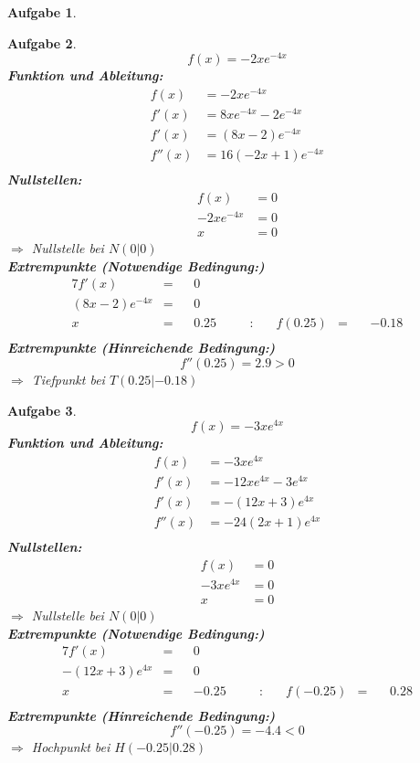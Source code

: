 \documentclass[12pt]{article}
\theoremstyle{note}
\newtheorem{aufgabe}{Aufgabe}
\begin{document}
\begin{flushleft}
\begin{aufgabe}
\end{aufgabe}\clearpage\begin{aufgabe} ~  
$$f(x)=- 2 x e^{- 4 x}$$ 
{\bf Funktion und Ableitung:} 
\begin{align*} 
f(x)&=- 2 x e^{- 4 x}\\ 
f'(x)&=8 x e^{- 4 x} - 2 e^{- 4 x}\\ 
f'(x)&=\left(8 x - 2\right) e^{- 4 x}\\ 
f''(x)&=16 \left(- 2 x + 1\right) e^{- 4 x}\\ 
\end{align*} 
{\bf Nullstellen:} 
\begin{align*} 
f(x)&=0 \\ 
- 2 x e^{- 4 x}&=0 \\ 
x&=0\end{align*} 
$\Rightarrow$ Nullstelle bei $N(0|0)$ \\ 
{\bf Extrempunkte (Notwendige Bedingung:)} 
\begin{alignat*}{7} 
f'(x)&=& &0& \\ 
\left(8 x - 2\right) e^{- 4 x}&=& &0& \\ 
x&=& &0.25& \quad &:& \quad f(0.25)&=& \, &-0.18\\ 
\end{alignat*} 
{\bf Extrempunkte (Hinreichende Bedingung:)} 
\\ 
$$f''(0.25)=2.9> 0 $$ 
$\Rightarrow$ Tiefpunkt bei $T(0.25|-0.18)$ \\ 

\end{aufgabe}\clearpage\begin{aufgabe} ~  
$$f(x)=- 3 x e^{4 x}$$ 
{\bf Funktion und Ableitung:} 
\begin{align*} 
f(x)&=- 3 x e^{4 x}\\ 
f'(x)&=- 12 x e^{4 x} - 3 e^{4 x}\\ 
f'(x)&=- \left(12 x + 3\right) e^{4 x}\\ 
f''(x)&=- 24 \left(2 x + 1\right) e^{4 x}\\ 
\end{align*} 
{\bf Nullstellen:} 
\begin{align*} 
f(x)&=0 \\ 
- 3 x e^{4 x}&=0 \\ 
x&=0\end{align*} 
$\Rightarrow$ Nullstelle bei $N(0|0)$ \\ 
{\bf Extrempunkte (Notwendige Bedingung:)} 
\begin{alignat*}{7} 
f'(x)&=& &0& \\ 
- \left(12 x + 3\right) e^{4 x}&=& &0& \\ 
x&=& &-0.25& \quad &:& \quad f(-0.25)&=& \, &0.28\\ 
\end{alignat*} 
{\bf Extrempunkte (Hinreichende Bedingung:)} 
\\ 
$$f''(-0.25)=-4.4< 0 $$ 
$\Rightarrow$ Hochpunkt bei $H(-0.25|0.28)$ \\ 

\end{aufgabe}\clearpage
\end{flushleft} 
\end{document}

